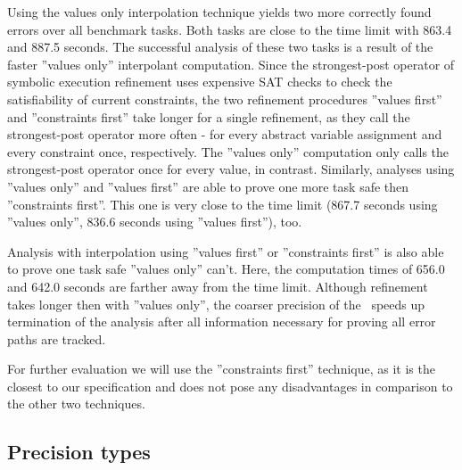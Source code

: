 Using the values only interpolation technique yields two more correctly found errors over all benchmark tasks.
Both tasks are close to the time limit with 863.4 and 887.5 seconds.
The successful analysis of these two tasks is a result of the faster ''values only'' interpolant computation.
Since the strongest-post operator of symbolic execution refinement uses expensive SAT checks to check the satisfiability of current constraints, the two refinement procedures
''values first'' and ''constraints first'' take longer for a single refinement, as they call the strongest-post operator more often - for every abstract variable assignment and every constraint once, respectively.
The ''values only'' computation only calls the strongest-post operator once for every value, in contrast.
Similarly, analyses using ''values only'' and ''values first'' are able to prove one more task safe then ''constraints first''.
This one is very close to the time limit (867.7 seconds using ''values only'', 836.6 seconds using ''values first''), too.

Analysis with interpolation using ''values first'' or ''constraints first'' is also able to prove one task safe ''values only'' can't.
Here, the computation times of 656.0 and 642.0 seconds are farther away from the time limit.
Although refinement takes longer then with ''values only'', the coarser precision of the \constraintsCPA\ speeds up termination of the analysis after all information necessary for proving all error paths are tracked.

For further evaluation we will use the ''constraints first'' technique, as it is the closest to our specification and does not pose any disadvantages in comparison to the other two techniques.

\subsection{Precision types}


